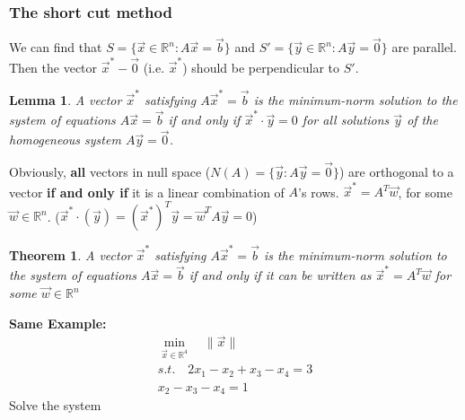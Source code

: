 \documentclass[11pt,a4paper]{article}
\newtheorem{theorem}{Theorem}
\newtheorem{lemma}{Lemma}
\begin{document}
\subsubsection{The short cut method}
We can find that $S=\{\vec{x}\in \mathbb{R}^n: A \vec{x}=\vec{b}\}$ and $S'=\{\vec{y}\in \mathbb{R}^n: A \vec{y}=\vec{0}\}$ are parallel. Then the vector $\vec{x}^*-\vec{0}$ (i.e. $\vec{x}^*$) should be perpendicular to $S'$.
\begin{lemma}
    A vector $\vec{x}^*$ satisfying $A \vec{x}^*=\vec{b}$ is the minimum-norm solution to the system of equations $A\vec{x}=\vec{b}$ if and only if $\vec{x}^*\cdot \vec{y}=0$ for all solutions $\vec{y}$ of the homogeneous system $A \vec{y}= \vec{0}$.
\end{lemma}
Obviously, \textbf{all} vectors in null space ($N(A)=\{\vec{y}:A \vec{y}=\vec{0}\}$) are orthogonal to a vector \textbf{if and only if} it is a linear combination of $A$'s rows. $\vec{x}^*=A^T \vec{w}$, for some $\vec{w}\in \mathbb{R}^n$. ($\vec{x}^* \cdot (\vec{y})= (\vec{x}^*)^T \vec{y}=\vec{w}^T A \vec{y}=0$)
\begin{theorem}
    A vector $\vec{x}^*$ satisfying $A \vec{x}^*=\vec{b}$ is the minimum-norm solution to the system of equations $A\vec{x}=\vec{b}$ if and only if it can be written as $\vec{x}^*=A^T \vec{w}$ for some $\vec{w}\in \mathbb{R}^n$
\end{theorem}
\begin{center}
\end{center}
\textbf{Same Example:}
\begin{equation}
    \begin{aligned}
        \min_{\vec{x}\in \mathbb{R}^4}\quad \|\vec{x}\|\\
        s.t.\quad2x_1-x_2+x_3-x_4=3\\
        x_2-x_3-x_4=1
    \end{aligned}
    \nonumber
\end{equation}
Solve the system
\end{document}
